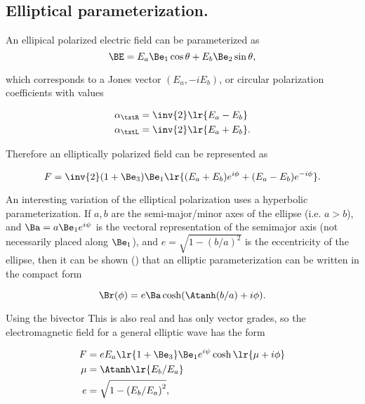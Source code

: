 
\subsection{Elliptical parameterization.}

An ellipical polarized electric field can be parameterized as
\begin{dmath}\label{eqn:ellipticalWaves:340}
\BE
=
E_a \Be_1 \cos\theta + E_b \Be_2 \sin\theta,
\end{dmath}

which corresponds to a Jones vector \( (E_a, -i E_b) \), or circular polarization coefficients with values

\begin{dmath}\label{eqn:polarization:400}
\begin{aligned}
\alpha_\txtR &= \inv{2}\lr{ E_a - E_b } \\
\alpha_\txtL &= \inv{2}\lr{ E_a + E_b }.
\end{aligned}
\end{dmath}

Therefore an elliptically polarized field can be represented as

\begin{dmath}\label{eqn:polarization:420}
F = \inv{2} (1 + \Be_3) \Be_1 \lr{ (E_a + E_b) e^{i\phi} + (E_a - E_b) e^{-i\phi} }.
\end{dmath}

An interesting variation of the elliptical polarization uses a hyperbolic parameterization.
If \( a, b \) are the semi-major/minor axes of the ellipse (i.e. \( a > b \)),
and \( \Ba = a \Be_1 e^{i\psi} \) is the vectoral representation of the semimajor axis (not necessarily placed along \( \Be_1 \)),
and \( e = \sqrt{1 - (b/a)^2} \) is the eccentricity of the ellipse,
then it can be shown (\citep{hestenes1999nfc})
that an elliptic parameterization can be written
in the compact form

\begin{dmath}\label{eqn:ellipticalWaves:360}
\Br(\phi)
=
e \Ba \cosh( \Atanh(b/a) + i \phi).
\end{dmath}

Using the bivector
This is also real and has only vector grades, so the electromagnetic field for a general elliptic wave has the form

\begin{dmath}\label{eqn:ellipticalWaves:380}
\begin{aligned}
F &= e E_a \lr{ 1 + \Be_3 } \Be_1 e^{ i \psi } \cosh\lr{ \mu + i \phi} \\
\mu &= \Atanh\lr{ E_b/E_a } \\
e &= \sqrt{1 - {(E_b/E_a)}^2 },
\end{aligned}
\end{dmath}

